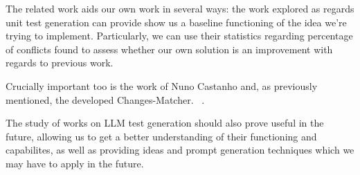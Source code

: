 The related work aids our own work in several ways: the work explored as regards unit test generation can provide show us a baseline functioning of the idea we're trying to implement. Particularly, we can use their statistics regarding percentage of conflicts found to assess whether our own solution is an improvement with regards to previous work.

Crucially important too is the work of Nuno Castanho and, as previously mentioned, the developed Changes-Matcher. ~\citep{kn:nuno}.

The study of works on LLM test generation should also prove useful in the future, allowing us to get a better understanding of their functioning and capabilites, as well as providing ideas and prompt generation techniques which we may have to apply in the future.